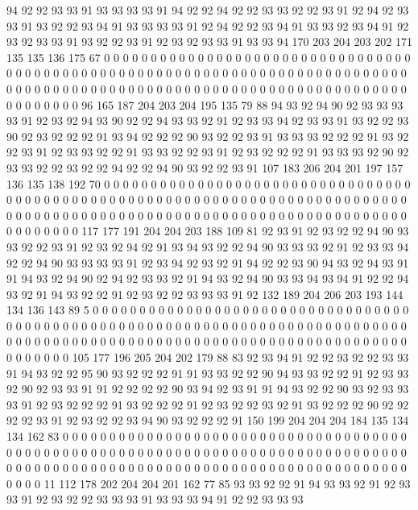 94 92 92 93 93 91 93 93 93 93 91 94 92 92 94 92 92 93 93 92
92 93 91 92 94 92 93 93 91 93 92 92 93 94 91 93 93 93 93 91
92 94 92 92 93 94 91 93 93 92 93 94 91 92 93 92 93 93 91 93
92 92 93 91 92 93 92 93 93 91 93 93 94 170 203 204 203 202 171 135
135 136 175 67 0 0 0 0 0 0 0 0 0 0 0 0 0 0 0 0
0 0 0 0 0 0 0 0 0 0 0 0 0 0 0 0 0 0 0 0
0 0 0 0 0 0 0 0 0 0 0 0 0 0 0 0 0 0 0 0
0 0 0 0 0 0 0 0 0 0 0 0 0 0 0 0 0 0 0 0
0 0 0 0 0 0 0 0 0 0 0 0 0 0 0 0 0 0 0 0
0 0 0 0 0 0 0 0 0 0 0 0 0 0 0 0 0 0 0 0
0 0 0 0 0 0 0 0 0 0 0 96 165 187 204 203 204 195 135 79
88 94 93 92 94 90 92 93 93 93 93 91 92 93 92 94 93 90 92 92
94 93 93 92 91 92 93 93 94 92 93 93 91 93 92 92 93 90 92 93
92 92 92 91 93 94 92 92 92 90 93 92 92 93 91 93 93 93 92 92
92 91 93 92 92 93 91 92 93 93 92 92 91 93 93 92 92 93 91 92
93 92 92 92 91 93 93 93 92 90 92 93 93 92 92 93 92 92 94 92
92 94 90 93 92 92 93 91 107 183 206 204 201 197 157 136 135 138 192 70
0 0 0 0 0 0 0 0 0 0 0 0 0 0 0 0 0 0 0 0
0 0 0 0 0 0 0 0 0 0 0 0 0 0 0 0 0 0 0 0
0 0 0 0 0 0 0 0 0 0 0 0 0 0 0 0 0 0 0 0
0 0 0 0 0 0 0 0 0 0 0 0 0 0 0 0 0 0 0 0
0 0 0 0 0 0 0 0 0 0 0 0 0 0 0 0 0 0 0 0
0 0 0 0 0 0 0 0 0 0 0 0 0 0 0 0 0 0 0 0
0 0 0 0 0 0 0 117 177 191 204 204 203 188 109 81 92 93 91 92
93 92 92 94 90 93 93 92 92 93 91 92 93 92 94 92 91 93 94 93
92 92 94 90 93 93 93 92 91 92 93 93 94 92 92 94 90 93 93 93
93 91 92 93 94 92 93 92 91 94 92 92 93 90 94 93 92 94 93 91
91 94 93 92 94 90 92 94 92 93 93 92 91 94 93 92 94 90 93 93
94 93 94 91 92 92 94 93 92 91 94 93 92 92 91 92 93 92 92 93
93 93 91 92 132 189 204 206 203 193 144 134 136 143 89 5 0 0 0 0
0 0 0 0 0 0 0 0 0 0 0 0 0 0 0 0 0 0 0 0
0 0 0 0 0 0 0 0 0 0 0 0 0 0 0 0 0 0 0 0
0 0 0 0 0 0 0 0 0 0 0 0 0 0 0 0 0 0 0 0
0 0 0 0 0 0 0 0 0 0 0 0 0 0 0 0 0 0 0 0
0 0 0 0 0 0 0 0 0 0 0 0 0 0 0 0 0 0 0 0
0 0 0 0 0 0 0 0 0 0 0 0 0 0 0 0 0 0 0 0
0 0 0 105 177 196 205 204 202 179 88 83 92 93 94 91 92 92 93 92
92 93 93 91 94 93 92 92 95 90 93 92 92 92 91 91 93 93 92 92
90 94 93 93 92 92 91 92 93 93 92 90 92 93 93 91 91 92 92 92
92 90 93 94 92 93 91 91 94 93 92 92 90 93 92 93 93 93 91 92
93 92 92 92 91 93 92 92 92 91 92 93 92 92 93 92 91 93 92 92
92 90 92 92 92 92 93 91 92 93 92 92 93 94 90 93 92 92 92 91
150 199 204 204 204 184 135 134 134 162 83 0 0 0 0 0 0 0 0 0
0 0 0 0 0 0 0 0 0 0 0 0 0 0 0 0 0 0 0 0
0 0 0 0 0 0 0 0 0 0 0 0 0 0 0 0 0 0 0 0
0 0 0 0 0 0 0 0 0 0 0 0 0 0 0 0 0 0 0 0
0 0 0 0 0 0 0 0 0 0 0 0 0 0 0 0 0 0 0 0
0 0 0 0 0 0 0 0 0 0 0 0 0 0 0 0 0 0 0 0
0 0 0 0 0 0 0 0 0 0 0 0 0 0 0 0 0 0 11 112
178 202 204 204 201 162 77 85 93 93 92 92 91 94 93 93 92 91 92 93
93 91 92 93 92 92 93 93 93 91 93 93 93 94 91 92 92 93 93 93

